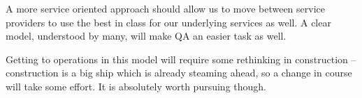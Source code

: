 A more service oriented approach should allow us to move between service providers to use the best in class for our underlying services as well.  A clear model, understood by many, will make \gls{QA} an easier task as well.

Getting to operations in this model will require some rethinking in construction -- construction is a big ship which is already steaming ahead, so a change in course will take some effort. It is absolutely worth pursuing though.

